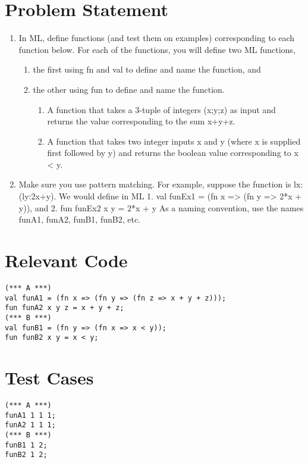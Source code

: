 \documentclass[twoside]{report}
\begin{document}
\section{Problem Statement}
\begin{enumerate}
    \item In ML, define functions (and test them on examples) corresponding to each function below. For each of the functions, you will define two ML functions,
    \begin{enumerate}
        \item the first using fn and val to define and name the function, and
        \item the other using fun to define and name the function.
        \begin{enumerate}
            \item A function that takes a 3-tuple of integers (x;y;z) as input and returns the value corresponding to the sum x+y+z.
            \item A function that takes two integer inputs x and y (where x is supplied first followed by y) and returns the boolean value corresponding to x < y.
        \end{enumerate}
    \end{enumerate}
    \item Make sure you use pattern matching. For example, suppose the function is lx:(ly:2x+y). We would define in ML 1. val funEx1 = (fn x => (fn y => 2*x + y)), and 2. fun funEx2 x y = 2*x + y As a naming convention, use the names funA1, funA2, funB1, funB2, etc.
\end{enumerate}
\section{Relevant Code}
    \begin{lstlisting}[frame=trBL]
(*** A ***)
val funA1 = (fn x => (fn y => (fn z => x + y + z)));
fun funA2 x y z = x + y + z;
(*** B ***)
val funB1 = (fn y => (fn x => x < y));
fun funB2 x y = x < y;
    \end{lstlisting}
\section{Test Cases}
    \begin{scriptsize}
    \begin{verbatim}
(*** A ***)
funA1 1 1 1;
funA2 1 1 1;
(*** B ***)
funB1 1 2;
funB2 1 2;
    \end{verbatim}
    \end{scriptsize}
\end{document}

